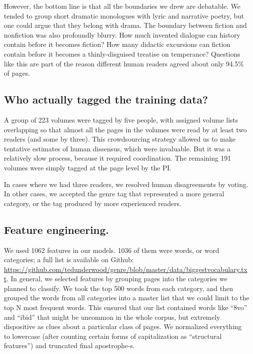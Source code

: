 \documentclass[paper=a4, fontsize=12pt]{scrartcl}
\numberwithin{equation}{section}		%
\numberwithin{figure}{section}			%
\numberwithin{table}{section}				%
\begin{document}
However, the bottom line is that all the boundaries we drew are debatable. We tended to group short dramatic monologues with lyric and narrative poetry, but one could argue that they belong with drama. The boundary between fiction and nonfiction was also profoundly blurry. How much invented dialogue can history contain before it becomes fiction? How many didactic excursions can fiction contain before it becomes a thinly-disguised treatise on temperance? Questions like this are part of the reason different human readers agreed about only 94.5\% of pages.

\subsection{Who actually tagged the training data?}
A group of 223 volumes were tagged by five people, with assigned volume lists overlapping so that almost all the pages in the volumes were read by at least two readers (and some by three). This crowdsourcing strategy allowed us to make tentative estimates of human dissensus, which were invaluable. But it was a relatively slow process, because it required coordination. The remaining 191 volumes were simply tagged at the page level by the PI.

In cases where we had three readers, we resolved human disagreements by voting. In other cases, we accepted the genre tag that represented a more general category, or the tag produced by more experienced readers.

\subsection{Feature engineering.}

We used 1062 features in our models. 1036 of them were words, or word categories; a full list is available on Github: \url{https://github.com/tedunderwood/genre/blob/master/data/biggestvocabulary.txt}. In general, we selected features by grouping pages into the categories we planned to classify. We took the top 500 words from each category, and then grouped the words from all categories into a master list that we could limit to the top N most frequent words. This ensured that our list contained words like ``8vo'' and ``ibid'' that might be uncommon in the whole corpus, but extremely dispositive as clues about a particular class of pages. We normalized everything to lowercase (after counting certain forms of capitalization as ``structural features'') and truncated final apostrophe-s.
\end{document}
